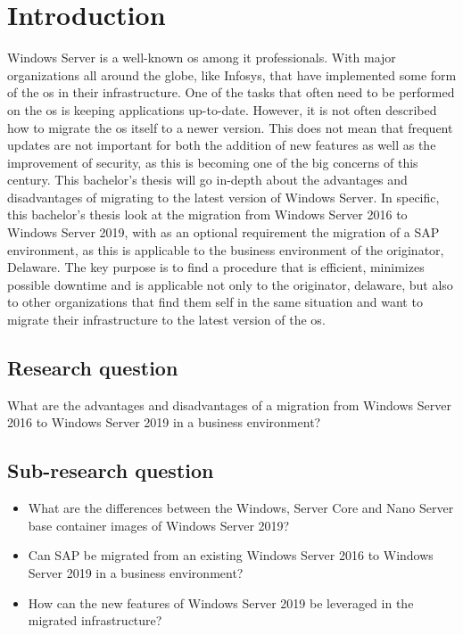 \section{Introduction}\label{sec:introduction}
Windows Server is a well-known \acrfull{os} among \acrfull{it} professionals. With major organizations all around the globe, like Infosys, that have implemented some form of the \acrshort{os} in their infrastructure. \autocite{S.Chauhan2015}
One of the tasks that often need to be performed on the \acrshort{os} is keeping applications up-to-date. However, it is not often described how to migrate the \acrshort{os} itself to a newer version.  
This does not mean that frequent updates are not important for both the addition of new features as well as the improvement of security, as this is becoming one of the big concerns of this century. 
This bachelor's thesis will go in-depth about the advantages and disadvantages of migrating to the latest version of Windows Server.
In specific, this bachelor's thesis look at the migration from Windows Server 2016 to Windows Server 2019, with as an optional requirement the migration of a SAP environment, as this is applicable to the business environment of the originator, Delaware.
The key purpose is to find a procedure that is efficient, minimizes possible downtime and is applicable not only to the originator, delaware, but also to other organizations that find them self in the same situation and want to migrate their infrastructure to the latest version of the \acrshort{os}.
\subsection{Research question}
What are the advantages and disadvantages of a migration from Windows Server 2016 to Windows Server 2019 in a business environment?
\subsection{Sub-research question}
\begin{itemize}
	\item What are the differences between the Windows, Server Core and Nano Server base container images of Windows Server 2019?
	\item Can SAP be migrated from an existing Windows Server 2016 to Windows Server 2019 in a business environment?
	\item How can the new features of Windows Server 2019 be leveraged in the migrated infrastructure? 
\end{itemize}
